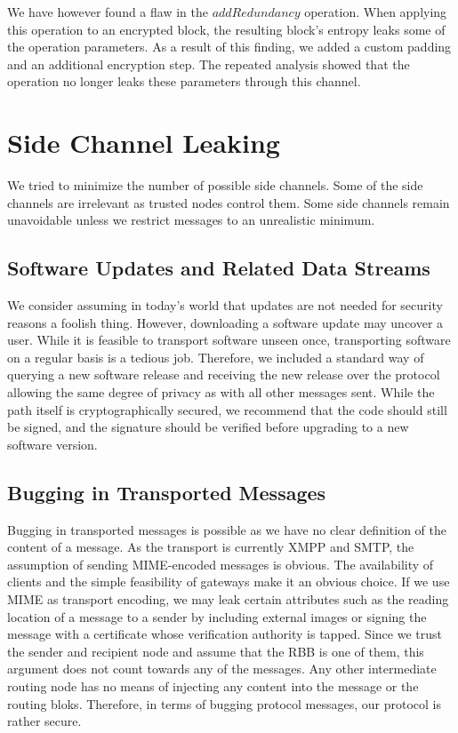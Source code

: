 We have however found a flaw in the $addRedundancy$ operation. When applying this operation to an encrypted block, the resulting block's entropy leaks some of the operation parameters. As a result of this finding, we added a custom padding and an additional encryption step. The repeated analysis showed that the operation no longer leaks these parameters through this channel.

\section{Side Channel Leaking}
We tried to minimize the number of possible side channels. Some of the side channels are irrelevant as trusted nodes control them. Some side channels remain unavoidable unless we restrict messages to an unrealistic minimum. 

\subsection{Software Updates and Related Data Streams}
We consider assuming in today's world that updates are not needed for security reasons a foolish thing. However, downloading a software update may uncover a user. While it is feasible to transport software unseen once, transporting software on a regular basis is a tedious job. Therefore, we included a standard way of querying a new software release and receiving the new release over the \MessageVortex{} protocol allowing the same degree of privacy as with all other messages sent. While the path itself is cryptographically secured, we recommend that the code should still be signed, and the signature should be verified before upgrading to a new software version.

\subsection{Bugging in Transported Messages}
Bugging in transported messages is possible as we have no clear definition of the content of a message. As the transport is currently XMPP and SMTP, the assumption of sending MIME-encoded messages is obvious. The availability of clients and the simple feasibility of gateways make it an obvious choice. If we use MIME as transport encoding, we may leak certain attributes such as the reading location of a message to a sender by including external images or signing the message with a certificate whose verification authority is tapped. Since we trust the sender and recipient node and assume that the RBB is one of them, this argument does not count towards any of the messages. Any other intermediate routing node has no means of injecting any content into the message or the routing bloks. Therefore, in terms of bugging protocol messages, our protocol is rather secure.

